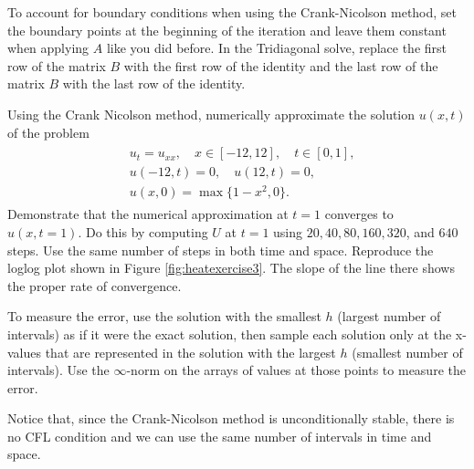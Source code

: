 To account for boundary conditions when using the Crank-Nicolson method, set the boundary points at the beginning of the iteration and leave them constant when applying $A$ like you did before.
In the Tridiagonal solve, replace the first row of the matrix $B$ with the first row of the identity and the last row of the matrix $B$ with the last row of the identity.

\begin{problem}
\label{prob:heat_exercise3}
Using the Crank Nicolson method, numerically approximate the solution $u(x,t)$ of the problem
\begin{align}
	\begin{split}
	&{ } u_t = u_{xx}, \quad x \in [-12,12],\quad t \in [0,1],\\
	&{ } u(-12,t) = 0,\quad u(12,t) = 0,\\
	&{ } u(x,0) = \max\{1 - x^2,0\}.
	\end{split}
\end{align}
Demonstrate that the numerical approximation at $t = 1$ converges to  $u(x,t=1)$.
Do this by computing $U$ at $t=1$ using $20,40,80,160,320$, and $640$ steps.
Use the same number of steps in both time and space.
Reproduce the loglog plot shown in Figure \ref{fig:heatexercise3}.
The slope of the line there shows the proper rate of convergence.

To measure the error, use the solution with the smallest $h$ (largest number of intervals) as if it were the exact solution, then sample each solution only at the x-values that are represented in the solution with the largest $h$ (smallest number of intervals).
Use the $\infty$-norm on the arrays of values at those points to measure the error.

Notice that, since the Crank-Nicolson method is unconditionally stable, there is no CFL condition and we can use the same number of intervals in time and space.
\end{problem}

